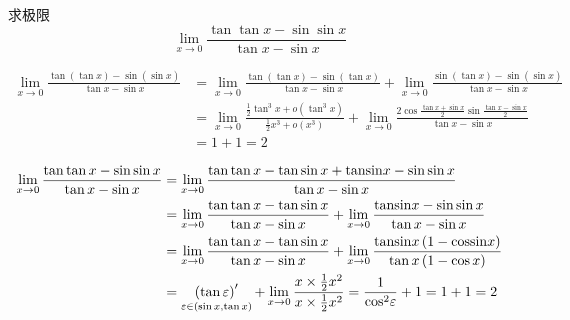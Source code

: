 \documentclass[color=green,titlestyle=hang]{elegantbook}%
\begin{document}
\begin{exercise}
求极限\[\mathop {\lim }\limits_{x \to 0} \frac{{\tan \tan x - \sin \sin x}}{{\tan x - \sin x}}\]
\end{exercise}\begin{Solution}\begin{align*}
\lim_{x\to0}\frac{\tan(\tan x)-\sin(\sin x)}{\tan x-\sin x}&=\lim_{x\to0}\frac{\tan(\tan x)-\sin(\tan x)}{\tan x-\sin x}+\lim_{x\to0}\frac{\sin(\tan x)-\sin(\sin x)}{\tan x-\sin x}\\
&=\lim_{x\to0}\frac{\frac{1}{2}\tan^3x+o(\tan^3x)}{\frac{1}{2}x^3+o(x^3)}+\lim_{x\to0}\frac{2\cos\frac{\tan x+\sin x}{2}\sin\frac{\tan x-\sin x}{2}}{\tan x-\sin x}\\
&=1+1=2
\end{align*}	
\end{Solution}\begin{Solution}\begin{align*}
\lim_{x \to 0} \frac{{\tan \tan x - \sin \sin x}}{{\tan x - \sin x}} &=\lim_{x \to 0} \frac{{\tan \tan x - \tan \sin x + {\mathop{\rm tansin}\nolimits} x - \sin \sin x}}{{\tan x - \sin x}}\\
& =\lim_{x \to 0} \frac{{\tan \tan x - \tan \sin x}}{{\tan x - \sin x}} + \mathop {\lim }\limits_{x \to 0} \frac{{{\mathop{\rm tansin}\nolimits} x - \sin \sin x}}{{\tan x - \sin x}}\\
&=\lim_{x \to 0} \frac{{\tan \tan x - \tan \sin x}}{{\tan x - \sin x}} +\lim_{x \to 0} \frac{{{\mathop{\rm tansin}\nolimits} x\left( {1 - {\mathop{\rm cossin}\nolimits} x} \right)}}{{\tan x\left( {1 - \cos x} \right)}}\\
&= \mathop{{\left( {\tan \varepsilon } \right)^\prime } }_{\varepsilon  \in \left( {\sin x,\tan x} \right)}+\lim_{x \to 0} \frac{{x \times \frac{1}{2}{x^2}}}{{x \times \frac{1}{2}{x^2}}} = \frac{1}{{{{\cos }^2}\varepsilon }} + 1 = 1 + 1 = 2
\end{align*}
\end{Solution}
\end{document}
